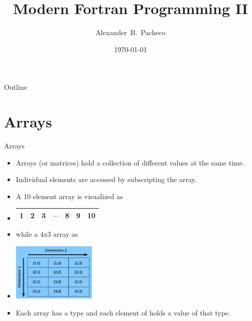 \documentclass[10pt,t]{beamer}
\title{Modern Fortran Programming II}
\author[Alex Pacheco]{\large{Alexander~B.~Pacheco}}
\institute{\href{http://researchcomputing.lehigh.edu}{LTS Research Computing}}
\date{\today}
\begin{document}
\frame{\titlepage}

\begin{frame}{Outline}
  \tableofcontents
\end{frame}


\section{Arrays}
\begin{frame}{Arrays}
  \begin{itemize}
    \item Arrays (or matrices) hold a collection of different values at the same time.
    \item Individual elements are accessed by subscripting the array.
    \item A 10 element array is visualized as
    \item[]
      \begin{center}
        \begin{tabular}{|c|c|c|c|c|c|c|}
          \hline
          1 & 2 & 3 & $\cdots$ & 8 & 9 & 10 \\
          \hline
        \end{tabular}
      \end{center}
    \item[] while a 4x3 array as
    \item[]
      \begin{center}
        \includegraphics[width=4cm]{./graphics/array1}
      \end{center}
    \item Each array has a type and each element of holds a value of that type.
  \end{itemize}
\end{frame} 
\end{document}
